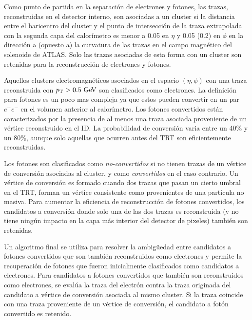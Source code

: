 Como punto de partida en la separación de electrones y fotones, las trazas,
reconstruidas en el detector interno, son asociadas a un cluster si la distancia
entre el baricentro del cluster y el punto de intersección de la traza
extrapolada con la segunda capa del calorímetro es menor a 0.05 en $\eta$ y 0.05
(0.2) en $\phi$ en la dirección a (opuesto a) la curvatura de las trazas en el
campo magnético del solenoide de ATLAS. Solo las trazas asociadas de esta forma
con un cluster son retenidas para la reconstrucción de electrones y fotones.

Aquellos clusters electromagnéticos asociados en el espacio $(\eta,\phi)$ con
una traza reconstruida con $\pt > 0.5 \gev$ son clasificados como electrones. La
definición para fotones es un poco mas compleja ya que estos pueden convertir en
un par $e^+e^-$ en el volumen anterior al calorímetro. Los fotones convertidos
están caracterizados por la presencia de al menos una traza asociada proveniente
de un vértice reconstruido en el ID. La probabilidad de conversión varia entre
un 40\% y un 80\%, aunque solo aquellas que ocurren antes del TRT son
eficientemente reconstruidas.

Los fotones son clasificados como \emph{no-convertidos} si no tienen trazas de
un vértice de conversión asociadas al cluster, y como \emph{convertidos} en el
caso contrario. Un vértice de conversión es formado cuando dos trazas que pasan
un cierto umbral en el TRT, forman un vértice consistente como provenientes de
una partícula no masiva. Para aumentar la eficiencia de reconstrucción de
fotones convertidos, los candidatos a conversión donde solo una de las dos
trazas es reconstruida (y no tiene ningún impacto en la capa más interior del
detector de pixeles) también son retenidas.

Un algoritmo final \cite{PhotonPerf} se utiliza para resolver la
ambigüedad entre candidatos a fotones convertidos que son también reconstruidos
como electrones y permite la recuperación de fotones que fueron inicialmente
clasificados como candidatos a electrones.
Para candidatos a fotones convertidos que también son reconstruidos como
electrones, se evalúa la traza del electrón contra la traza originada del
candidato a vértice de conversión asociada al mismo cluster. Si la traza
coincide con una traza proveniente de un vértice de conversión, el candidato a
fotón convertido es retenido.




